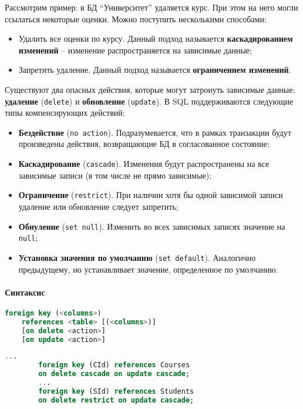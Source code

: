 Рассмотрим пример: в БД ``Университет'' удаляется курс. При этом на него могли ссылаться некоторые
оценки. Можно поступить несколькими способами:

\begin{itemize}
	\item Удалить все оценки по курсу. Данный подход называется \textbf{каскадированием изменений} -- изменение
	      распространяется на зависимые данные;
	\item Запретить удаление. Данный подход называется \textbf{ограничением изменений}.
\end{itemize}

Существуют два опасных действия, которые могут затронуть зависимые данные: \textbf{удаление}
(\texttt{delete}) и
\textbf{обновление} (\texttt{update}). В SQL поддерживаются следующие типы компенсирующих действий:

\begin{itemize}
	\item \textbf{Бездействие} (\texttt{no action}). Подразумевается, что в рамках транзакции будут
	      произведены действия, возвращающие БД в согласованное состояние;
	\item \textbf{Каскадирование} (\texttt{cascade}). Изменения будут распространены на все
	      зависимые записи (в том числе не прямо зависимые);
	\item \textbf{Ограничение} (\texttt{restrict}). При наличии хотя бы одной зависимой записи
	      удаление или обновление следует запретить;
	\item \textbf{Обнуление} (\texttt{set null}). Изменить во всех зависимых записях значение на
	      \texttt{null};
	\item \textbf{Установка значения по умолчанию} (\texttt{set default}). Аналогично предыдущему,
	      но устанавливает значение, определенное по умолчанию.
\end{itemize}

\paragraph{Синтаксис}
\enewline

\begin{lstlisting}[language=SQL]
    foreign key (<columns>)
    references <table> [(<columns>)]
    [on delete <action>]
    [on update <action>]
\end{lstlisting}

\begin{examples}
	\enewline
	\begin{lstlisting}[language=SQL]
        ...
        foreign key (CId) references Courses
        on delete cascade on update cascade;
        ...
        foreign key (SId) references Students
        on delete restrict on update cascade;
    \end{lstlisting}
\end{examples}

